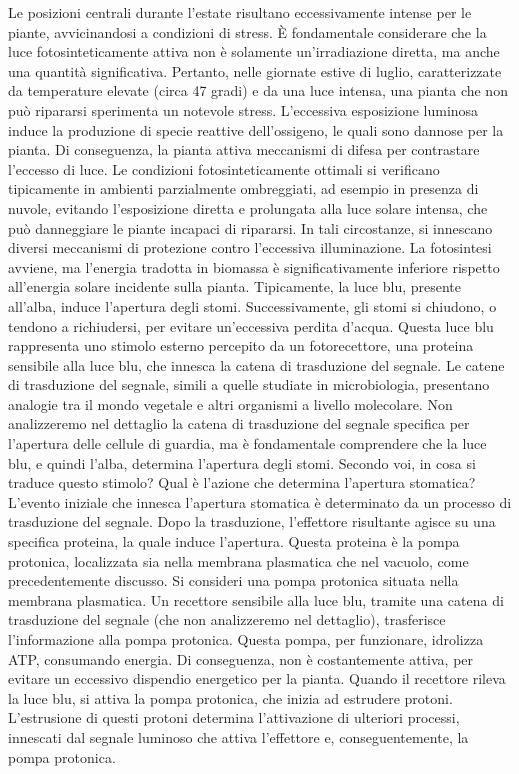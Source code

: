 \documentclass[11pt, a4paper]{article}
\begin{document}
\begin{spacing}{1}
Le posizioni centrali durante l'estate risultano eccessivamente intense per le piante, avvicinandosi a condizioni di stress. È fondamentale considerare che la luce fotosinteticamente attiva non è solamente un'irradiazione diretta, ma anche una quantità significativa. Pertanto, nelle giornate estive di luglio, caratterizzate da temperature elevate (circa 47 gradi) e da una luce intensa, una pianta che non può ripararsi sperimenta un notevole stress. L'eccessiva esposizione luminosa induce la produzione di specie reattive dell'ossigeno, le quali sono dannose per la pianta. Di conseguenza, la pianta attiva meccanismi di difesa per contrastare l'eccesso di luce. Le condizioni fotosinteticamente ottimali si verificano tipicamente in ambienti parzialmente ombreggiati, ad esempio in presenza di nuvole, evitando l'esposizione diretta e prolungata alla luce solare intensa, che può danneggiare le piante incapaci di ripararsi. In tali circostanze, si innescano diversi meccanismi di protezione contro l'eccessiva illuminazione.
La fotosintesi avviene, ma l'energia tradotta in biomassa è significativamente inferiore rispetto all'energia solare incidente sulla pianta. Tipicamente, la luce blu, presente all'alba, induce l'apertura degli stomi. Successivamente, gli stomi si chiudono, o tendono a richiudersi, per evitare un'eccessiva perdita d'acqua. Questa luce blu rappresenta uno stimolo esterno percepito da un fotorecettore, una proteina sensibile alla luce blu, che innesca la catena di trasduzione del segnale. Le catene di trasduzione del segnale, simili a quelle studiate in microbiologia, presentano analogie tra il mondo vegetale e altri organismi a livello molecolare. Non analizzeremo nel dettaglio la catena di trasduzione del segnale specifica per l'apertura delle cellule di guardia, ma è fondamentale comprendere che la luce blu, e quindi l'alba, determina l'apertura degli stomi. Secondo voi, in cosa si traduce questo stimolo? Qual è l'azione che determina l'apertura stomatica?
L'evento iniziale che innesca l'apertura stomatica è determinato da un processo di trasduzione del segnale. Dopo la trasduzione, l'effettore risultante agisce su una specifica proteina, la quale induce l'apertura. Questa proteina è la pompa protonica, localizzata sia nella membrana plasmatica che nel vacuolo, come precedentemente discusso.
Si consideri una pompa protonica situata nella membrana plasmatica. Un recettore sensibile alla luce blu, tramite una catena di trasduzione del segnale (che non analizzeremo nel dettaglio), trasferisce l'informazione alla pompa protonica. Questa pompa, per funzionare, idrolizza ATP, consumando energia. Di conseguenza, non è costantemente attiva, per evitare un eccessivo dispendio energetico per la pianta. Quando il recettore rileva la luce blu, si attiva la pompa protonica, che inizia ad estrudere protoni. L'estrusione di questi protoni determina l'attivazione di ulteriori processi, innescati dal segnale luminoso che attiva l'effettore e, conseguentemente, la pompa protonica.

\end{spacing}
\end{document}
